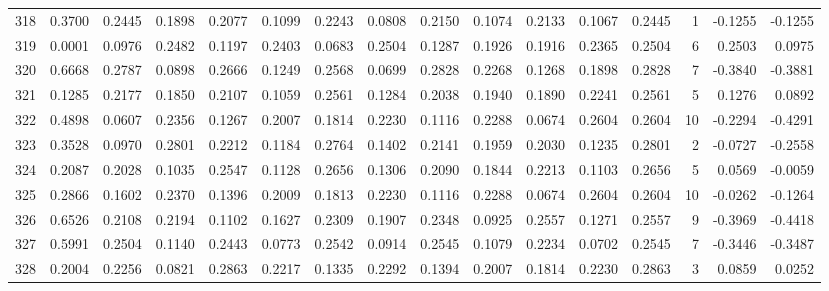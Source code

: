 \begin{tabular}{lrrrrrrrrrrrrrrr}
318 &      0.3700 &  0.2445 &  0.1898 &  0.2077 &  0.1099 &  0.2243 &  0.0808 &  0.2150 &  0.1074 &  0.2133 &   0.1067 &     0.2445 &      1 &                   -0.1255 &                    -0.1255 \\
319 &      0.0001 &  0.0976 &  0.2482 &  0.1197 &  0.2403 &  0.0683 &  0.2504 &  0.1287 &  0.1926 &  0.1916 &   0.2365 &     0.2504 &      6 &                    0.2503 &                     0.0975 \\
320 &      0.6668 &  0.2787 &  0.0898 &  0.2666 &  0.1249 &  0.2568 &  0.0699 &  0.2828 &  0.2268 &  0.1268 &   0.1898 &     0.2828 &      7 &                   -0.3840 &                    -0.3881 \\
321 &      0.1285 &  0.2177 &  0.1850 &  0.2107 &  0.1059 &  0.2561 &  0.1284 &  0.2038 &  0.1940 &  0.1890 &   0.2241 &     0.2561 &      5 &                    0.1276 &                     0.0892 \\
322 &      0.4898 &  0.0607 &  0.2356 &  0.1267 &  0.2007 &  0.1814 &  0.2230 &  0.1116 &  0.2288 &  0.0674 &   0.2604 &     0.2604 &     10 &                   -0.2294 &                    -0.4291 \\
323 &      0.3528 &  0.0970 &  0.2801 &  0.2212 &  0.1184 &  0.2764 &  0.1402 &  0.2141 &  0.1959 &  0.2030 &   0.1235 &     0.2801 &      2 &                   -0.0727 &                    -0.2558 \\
324 &      0.2087 &  0.2028 &  0.1035 &  0.2547 &  0.1128 &  0.2656 &  0.1306 &  0.2090 &  0.1844 &  0.2213 &   0.1103 &     0.2656 &      5 &                    0.0569 &                    -0.0059 \\
325 &      0.2866 &  0.1602 &  0.2370 &  0.1396 &  0.2009 &  0.1813 &  0.2230 &  0.1116 &  0.2288 &  0.0674 &   0.2604 &     0.2604 &     10 &                   -0.0262 &                    -0.1264 \\
326 &      0.6526 &  0.2108 &  0.2194 &  0.1102 &  0.1627 &  0.2309 &  0.1907 &  0.2348 &  0.0925 &  0.2557 &   0.1271 &     0.2557 &      9 &                   -0.3969 &                    -0.4418 \\
327 &      0.5991 &  0.2504 &  0.1140 &  0.2443 &  0.0773 &  0.2542 &  0.0914 &  0.2545 &  0.1079 &  0.2234 &   0.0702 &     0.2545 &      7 &                   -0.3446 &                    -0.3487 \\
328 &      0.2004 &  0.2256 &  0.0821 &  0.2863 &  0.2217 &  0.1335 &  0.2292 &  0.1394 &  0.2007 &  0.1814 &   0.2230 &     0.2863 &      3 &                    0.0859 &                     0.0252 \\

\end{tabular}

